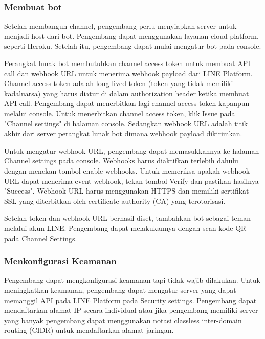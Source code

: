 \subsubsection{Membuat bot}
Setelah membangun channel, pengembang perlu menyiapkan server untuk menjadi host dari bot. Pengembang dapat menggunakan layanan cloud platform, seperti Heroku. Setelah itu, pengembang dapat mulai mengatur bot pada console.

Perangkat lunak bot membutuhkan channel access token untuk membuat API call dan webhook URL untuk menerima webhook payload dari LINE Platform. Channel access token adalah long-lived token (token yang tidak memiliki kadaluarsa) yang harus diatur di dalam authorization header ketika membuat API call. Pengembang dapat menerbitkan lagi channel access token kapanpun melalui console. Untuk menerbitkan channel access token, klik Issue pada "Channel settings" di halaman console. Sedangkan webhook URL adalah titik akhir dari server perangkat lunak bot dimana webhook payload dikirimkan.


Untuk mengatur webhook URL, pengembang dapat memasukkannya ke halaman Channel settings pada console. Webhooks harus diaktifkan terlebih dahulu dengan menekan tombol enable webhooks. Untuk memeriksa apakah webhook URL dapat menerima event webhook, tekan tombol Verify dan pastikan hasilnya "Success". Webhook URL harus menggunakan HTTPS dan memiliki sertifikat SSL yang diterbitkan oleh certificate authority (CA) yang terotorisasi.


Setelah token dan webhook URL berhasil diset, tambahkan bot sebagai teman melalui akun LINE. Pengembang dapat melakukannya dengan scan kode QR pada Channel Settings.


\subsubsection{Menkonfigurasi Keamanan}
Pengembang dapat mengkonfigurasi keamanan tapi tidak wajib dilakukan. Untuk meningkatkan keamanan, pengembang dapat mengatur server yang dapat memanggil API pada LINE Platform pada Security settings. Pengembang dapat mendaftarkan alamat IP secara individual atau jika pengembang memiliki server yang banyak pengembang dapat menggunakan notasi classless inter-domain routing (CIDR) untuk mendaftarkan alamat jaringan.

